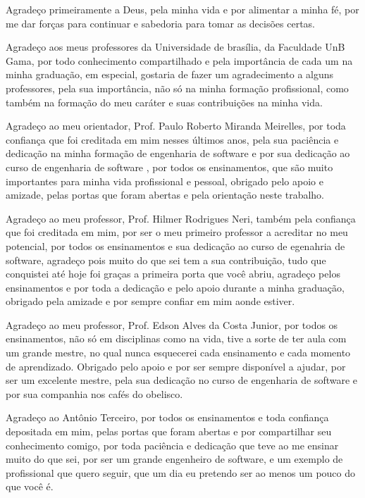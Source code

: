 \begin{agradecimentos}
Agradeço primeiramente a Deus, pela minha vida e por alimentar a minha fé, por
me dar forças para continuar e sabedoria para tomar as decisões certas.

Agradeço aos meus professores da Universidade de brasília, da Faculdade UnB Gama,
por todo conhecimento compartilhado e pela importância de cada um na minha graduação,
em especial, gostaria de fazer um agradecimento a alguns professores,
pela sua importância, não só na minha formação profissional, como também na formação
do meu caráter e suas contribuições na minha vida.

Agradeço ao meu orientador, Prof. Paulo Roberto Miranda Meirelles, por toda confiança
que foi creditada em mim nesses últimos anos, pela sua paciência e dedicação na minha
formação de engenharia de software e por sua dedicação ao curso de engenharia de software
, por todos os ensinamentos, que são muito importantes
para minha vida profissional e pessoal, obrigado pelo apoio e amizade, pelas portas
que foram abertas e pela orientação neste trabalho.

Agradeço ao meu professor, Prof. Hilmer Rodrigues Neri, também pela confiança que foi
creditada em mim, por ser o meu primeiro professor a acreditar no meu
potencial, por todos os ensinamentos e sua dedicação ao curso de egenahria de software, 
agradeço pois muito do que sei tem a sua
contribuição, tudo que conquistei até hoje foi graças a primeira porta que você
abriu, agradeço pelos ensinamentos e por toda a dedicação e pelo apoio durante a
minha graduação, obrigado pela amizade e por sempre confiar em mim aonde estiver.

Agradeço ao meu professor, Prof. Edson Alves da Costa Junior, por todos os ensinamentos, não
só em disciplinas como na vida, tive a sorte de ter aula com um grande mestre,
no qual nunca esquecerei cada ensinamento e cada momento de aprendizado. Obrigado
pelo apoio e por ser sempre disponível a ajudar, por ser um excelente mestre, pela
sua dedicação no curso de engenharia de software e por sua companhia nos cafés do obelisco.

Agradeço ao Antônio Terceiro, por todos os ensinamentos e toda confiança depositada
em mim, pelas portas que foram abertas e por compartilhar seu conhecimento comigo, 
por toda paciência e dedicação que teve ao me ensinar muito do que sei, por ser
um grande engenheiro de software, e um exemplo de profissional que quero seguir, 
que um dia eu pretendo ser ao menos um pouco do que você é.


\end{agradecimentos}
